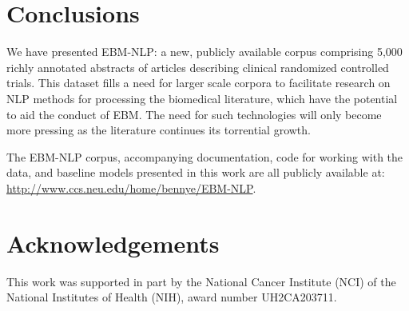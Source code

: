 \documentclass[11pt,a4paper]{article}
\begin{document}
\section{Conclusions}
\label{section:conclusions}

We have presented EBM-NLP: a new, publicly available corpus comprising 5,000 richly annotated abstracts of articles describing clinical randomized controlled trials. This dataset fills a need for larger scale corpora to facilitate research on NLP methods for processing the biomedical literature, which have the potential to aid the conduct of EBM. The need for such technologies will only become more pressing as the literature continues its torrential growth.  

The EBM-NLP corpus, accompanying documentation, code for working with the data, and baseline models presented in this work are all publicly available at: \url{http://www.ccs.neu.edu/home/bennye/EBM-NLP}. 


\section{Acknowledgements}

This work was supported in part by the National
Cancer Institute (NCI) of the National Institutes of
Health (NIH), award number UH2CA203711. 
\end{document}
